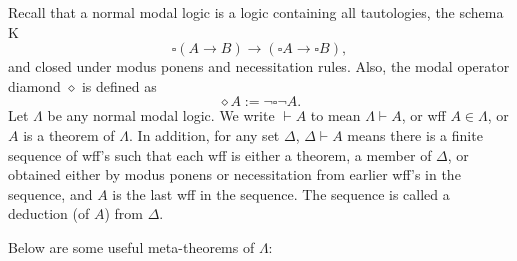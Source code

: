 \documentclass[12pt]{article}
\begin{document}
Recall that a normal modal logic is a logic containing all tautologies, the schema K
$$\square (A\to B) \to (\square A \to \square B),$$
and closed under modus ponens and necessitation rules.  Also, the modal operator diamond $\diamond$ is defined as $$\diamond A:=\neg \square \neg A.$$
Let $\Lambda$ be any normal modal logic.  We write $\vdash A$ to mean $\Lambda \vdash A$, or wff $A\in \Lambda$, or $A$ is a theorem of $\Lambda$.  In addition, for any set $\Delta$, $\Delta \vdash A$ means there is a finite sequence of wff's such that each wff is either a theorem, a member of $\Delta$, or obtained either by modus ponens or necessitation from earlier wff's in the sequence, and $A$ is the last wff in the sequence.  The sequence is called a deduction (of $A$) from $\Delta$.

Below are some useful meta-theorems of $\Lambda$:
\end{document}
